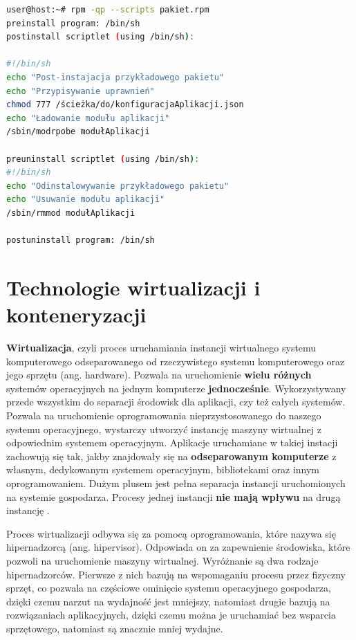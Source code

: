 \begin{lstlisting}[label={lst:skryptRPM}, language=bash, caption={Skrypty pakietu RPM}]
user@host:~# rpm -qp --scripts pakiet.rpm
preinstall program: /bin/sh
postinstall scriptlet (using /bin/sh):

#!/bin/sh
echo "Post-instajacja przykładowego pakietu"
echo "Przypisywanie uprawnień"
chmod 777 /ścieżka/do/konfiguracjaAplikacji.json
echo "Ładowanie modułu aplikacji"
/sbin/modrpobe modułAplikacji

preuninstall scriptlet (using /bin/sh):
#!/bin/sh
echo "Odinstalowywanie przykładowego pakietu"
echo "Usuwanie modułu aplikacji"
/sbin/rmmod modułAplikacji

postuninstall program: /bin/sh
\end{lstlisting}

\section{Technologie wirtualizacji i konteneryzacji}

\textbf{Wirtualizacja}, czyli proces uruchamiania instancji wirtualnego systemu komputerowego odseparowanego od rzeczywistego systemu komputerowego oraz jego sprzętu (ang. hardware). Pozwala na uruchomienie \textbf{wielu różnych} systemów operacyjnych na jednym komputerze \textbf{jednocześnie}. Wykorzystywany przede wszystkim do separacji środowisk dla aplikacji, czy też całych systemów. Pozwala na uruchomienie oprogramowania nieprzystosowanego do naszego systemu operacyjnego, wystarczy utworzyć instancję maszyny wirtualnej z odpowiednim systemem operacyjnym. Aplikacje uruchamiane w takiej instacji zachowują się tak, jakby znajdowały się na \textbf{odseparowanym komputerze} z własnym, dedykowanym systemem operacyjnym, bibliotekami oraz innym oprogramowaniem. Dużym plusem jest pełna separacja instancji uruchomionych na systemie gospodarza. Procesy jednej instancji \textbf{nie mają wpływu} na drugą instancję \cite{Virt}.\par

Proces wirtualizacji odbywa się za pomocą oprogramowania, które nazywa się hipernadzorcą (ang. hipervisor). Odpowiada on za zapewnienie środowiska, które pozwoli na uruchomienie maszyny wirtualnej. Wyróżnanie są dwa rodzaje hipernadzorców. Pierwsze z nich bazują na wspomaganiu procesu przez fizyczny sprzęt, co pozwala na częściowe ominięcie systemu operacyjnego gospodarza, dzięki czemu narzut na wydajność jest mniejszy, natomiast drugie bazują na rozwiązaniach aplikacyjnych, dzięki czemu można je uruchamiać bez wsparcia sprzętowego, natomiast są znacznie mniej wydajne.

